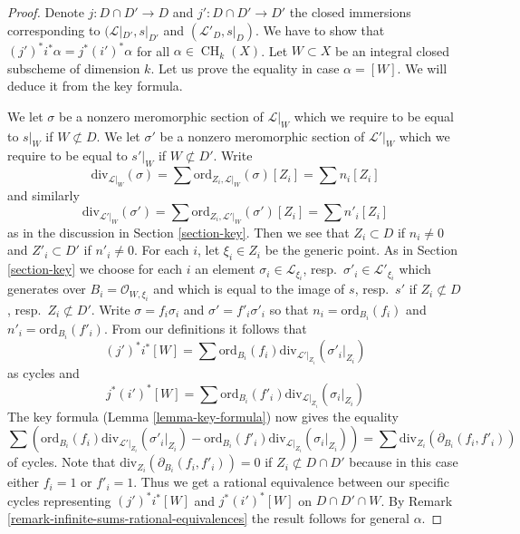 \documentclass[10pt,a4paper]{amsart}
\theoremstyle{plain}
\theoremstyle{definition}
\theoremstyle{remark}
\numberwithin{equation}{subsection}
\def\CH{\mathop{\mathrm{CH}}\nolimits}
\begin{document}
\begin{proof}
Denote $j : D \cap D' \to D$ and $j' : D \cap D' \to D'$ the closed
immersions corresponding to $(\mathcal{L}|_{D'}, s|_{D'}$ and
$(\mathcal{L}'_D, s|_D)$. We have to show that
$(j')^*i^*\alpha = j^* (i')^*\alpha$ for all $\alpha \in \CH_k(X)$.
Let $W \subset X$ be an integral closed subscheme of dimension $k$.
Let us prove the equality in case $\alpha = [W]$. We will deduce
it from the key formula.

\medskip\noindent
We let $\sigma$ be a nonzero meromorphic section of $\mathcal{L}|_W$
which we require to be equal to $s|_W$ if $W \not \subset D$.
We let $\sigma'$ be a nonzero meromorphic section of $\mathcal{L}'|_W$
which we require to be equal to $s'|_W$ if $W \not \subset D'$.
Write
$$
\text{div}_{\mathcal{L}|_W}(\sigma) =
\sum \text{ord}_{Z_i, \mathcal{L}|_W}(\sigma)[Z_i] = \sum n_i[Z_i]
$$
and similarly
$$
\text{div}_{\mathcal{L}'|_W}(\sigma') =
\sum \text{ord}_{Z_i, \mathcal{L}'|_W}(\sigma')[Z_i] = \sum n'_i[Z_i]
$$
as in the discussion in Section \ref{section-key}.
Then we see that $Z_i \subset D$ if $n_i \not = 0$ and
$Z'_i \subset D'$ if $n'_i \not = 0$. For each $i$, let $\xi_i \in Z_i$
be the generic point. As in Section \ref{section-key} we choose
for each $i$ an element
$\sigma_i \in \mathcal{L}_{\xi_i}$, resp.\ $\sigma'_i \in \mathcal{L}'_{\xi_i}$
which generates over $B_i = \mathcal{O}_{W, \xi_i}$
and which is equal to the image of
$s$, resp.\ $s'$ if $Z_i \not \subset D$, resp.\ $Z_i \not \subset D'$.
Write $\sigma = f_i \sigma_i$ and $\sigma' = f'_i\sigma'_i$ so that
$n_i = \text{ord}_{B_i}(f_i)$ and
$n'_i = \text{ord}_{B_i}(f'_i)$.
From our definitions it follows that
$$
(j')^*i^*[W] =
\sum \text{ord}_{B_i}(f_i) \text{div}_{\mathcal{L}'|_{Z_i}}(\sigma'_i|_{Z_i})
$$
as cycles and
$$
j^*(i')^*[W] =
\sum \text{ord}_{B_i}(f'_i) \text{div}_{\mathcal{L}|_{Z_i}}(\sigma_i|_{Z_i})
$$
The key formula (Lemma \ref{lemma-key-formula}) now gives the equality
$$
\sum \left(
\text{ord}_{B_i}(f_i) \text{div}_{\mathcal{L}'|_{Z_i}}(\sigma'_i|_{Z_i}) -
\text{ord}_{B_i}(f'_i) \text{div}_{\mathcal{L}|_{Z_i}}(\sigma_i|_{Z_i})
\right) =
\sum \text{div}_{Z_i}(\partial_{B_i}(f_i, f'_i))
$$
of cycles. Note that $\text{div}_{Z_i}(\partial_{B_i}(f_i, f'_i)) = 0$ if
$Z_i \not \subset D \cap D'$ because in this case either $f_i = 1$
or $f'_i = 1$. Thus we get a rational equivalence between our specific
cycles representing $(j')^*i^*[W]$ and $j^*(i')^*[W]$ on $D \cap D' \cap W$.
By Remark \ref{remark-infinite-sums-rational-equivalences}
the result follows for general $\alpha$.
\end{proof}
\end{document}
